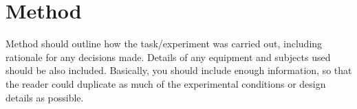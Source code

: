 \section{Method}
Method should outline how the task/experiment was carried out, including rationale for any decisions made. Details of any equipment and subjects used should be also included. Basically, you should include enough information, so that the reader could duplicate as much of the experimental conditions or design details as possible.

